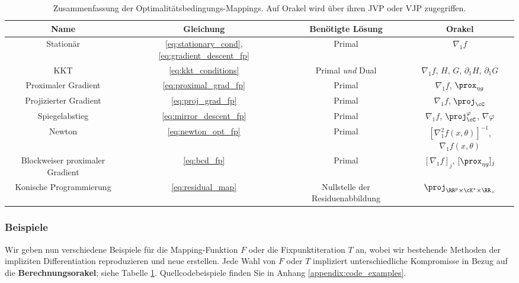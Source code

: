 \begin{table}[t]
\caption{Zusammenfassung der Optimalitätsbedingungs-Mappings. Auf Orakel wird über ihren JVP oder VJP zugegriffen.
}
\begin{center}
\begin{small}
\begin{tabular}{cccc}
\toprule
Name & Gleichung & Benötigte Lösung & Orakel \\
\midrule
Stationär & \eqref{eq:stationary_cond}, \eqref{eq:gradient_descent_fp} & 
Primal & $\nabla_1 f$ \\
KKT & \eqref{eq:kkt_conditions} & Primal \textit{und} Dual & 
$\nabla_1 f$, $H$, $G$, $\partial_1 H$, $\partial_1 G$ \\
Proximaler Gradient & \eqref{eq:proximal_grad_fp} & Primal & 
$\nabla_1 f$, $\prox_{\eta g}$ \\
Projizierter Gradient & \eqref{eq:proj_grad_fp} & Primal & $\nabla_1 f$, 
$\proj_{\cC}$ \\
Spiegelabstieg & \eqref{eq:mirror_descent_fp} & Primal & $\nabla_1 f$,
$\proj_\cC^\varphi$, $\nabla \varphi$ \\
Newton & \eqref{eq:newton_opt_fp} & Primal &
$[\nabla^2_1 f(x, \theta)]^{-1}$, $\nabla_1 f(x, \theta)$ \\
Blockweiser proximaler Gradient & \eqref{eq:bcd_fp} & Primal &
$[\nabla_1 f]_j$, $[\prox_{\eta g}]_j$ \\
Konische Programmierung & \eqref{eq:residual_map} & Nullstelle der Residuenabbildung & 
$\proj_{\RR^p \times \cK^* \times \RR_+}$ \\
\bottomrule
\end{tabular}
\end{small}
\end{center}
\label{tab:mapping_summary}
\end{table}

\subsubsection{Beispiele}
\label{sec:mapping_examples}

Wir geben nun verschiedene Beispiele für die Mapping-Funktion $F$ oder die Fixpunktiteration $T$ an, wobei wir bestehende Methoden der impliziten Differentiation reproduzieren und neue erstellen.
Jede Wahl von $F$ oder $T$ impliziert unterschiedliche Kompromisse in Bezug auf die \textbf{Berechnungsorakel}; siehe Tabelle \ref{tab:mapping_summary}. 
Quellcodebeispiele finden Sie in Anhang \ref{appendix:code_examples}.

